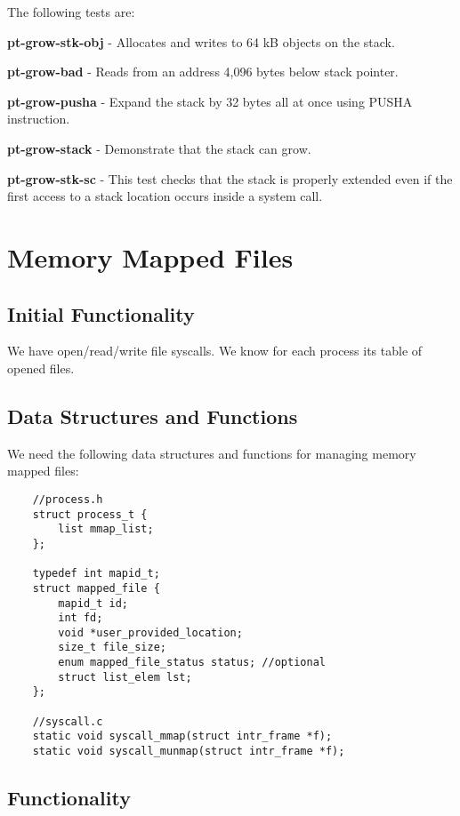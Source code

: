 The following tests are: 

\textbf{pt-grow-stk-obj} - Allocates and writes to 64 kB objects on the stack. 

\textbf{pt-grow-bad} - Reads from an address 4,096 bytes below stack pointer. 

\textbf{pt-grow-pusha} - Expand the stack by 32 bytes all at once using PUSHA instruction. 

\textbf{pt-grow-stack} - Demonstrate that the stack can grow. 

\textbf{pt-grow-stk-sc} - This test checks that the stack is properly extended even if the first access to a stack location occurs inside a system call. 



\section{Memory Mapped Files}
\subsection{Initial Functionality}

We have open/read/write file syscalls. We know for each process its table of opened files.


\subsection{Data Structures and Functions}

We need the following data structures and functions for managing memory mapped files: 

\begin{lstlisting}
	//process.h
	struct process_t {
		list mmap_list;
	};

	typedef int mapid_t;
	struct mapped_file {
		mapid_t id;
		int fd;
		void *user_provided_location;
		size_t file_size;
		enum mapped_file_status status; //optional
		struct list_elem lst;
	};

	//syscall.c
	static void syscall_mmap(struct intr_frame *f);
	static void syscall_munmap(struct intr_frame *f);
\end{lstlisting}
	


\subsection{Functionality}

